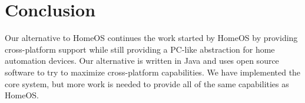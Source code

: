 \section{Conclusion}
\label{sec:conclusion}
Our alternative to HomeOS continues the work started by HomeOS by providing         
cross-platform support while still providing a PC-like abstraction for home         
automation devices. Our alternative is written in Java and uses open source         
software to try to maximize cross-platform capabilities. We have implemented the 
core system, but more work is needed to provide all of the same capabilities as  
HomeOS.
